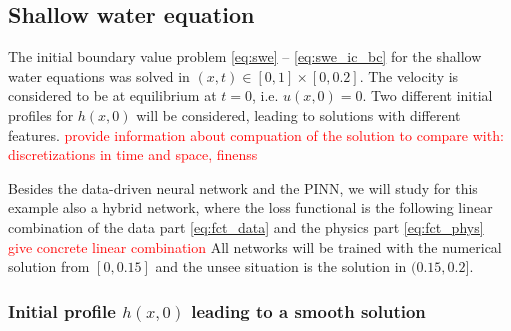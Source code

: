 \subsection{Shallow water equation}

The initial boundary value problem \eqref{eq:swe} -- \eqref{eq:swe_ic_bc} for the shallow water 
equations was solved in $(x,t) \in [0,1]\times [0,0.2]$. The velocity is considered to be at equilibrium at $t=0$, i.e. $u(x, 0) = 0$.
Two different initial profiles for 
$h(x,0)$ will be considered, leading to solutions with different features.
\textcolor{red}{provide 
information about compuation of the solution to compare with: discretizations in time and space, 
finenss}

Besides the data-driven neural network and the PINN, we will study for this example also a hybrid network, where the loss functional is the following linear combination of the data part \eqref{eq:fct_data} and the physics part \eqref{eq:fct_phys} \textcolor{red}{give concrete linear combination}
All networks will be trained with the numerical solution from $[0,0.15]$ and the unsee situation 
is the solution in $(0.15,0.2]$. 


  
\subsubsection{Initial profile $h(x, 0)$ leading to a smooth solution}

